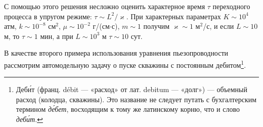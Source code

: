 С помощью этого решения несложно оценить характерное время $\tau$ переходного процесса в упругом режиме: $\tau\sim L^2/\varkappa$. При характерных параметрах $K\sim10^4$ атм, $k\sim10^{-8}$ см$^2$, $\mu\sim10^{-2}$ г/(см$\cdot$с), $m\sim1$ получим $\varkappa\sim1$ м$^2$/с, и если $L\sim10$ м, то $\tau\sim1$ мин, а при $L\sim10^3$ м $\tau\sim10$ сут.

\setcounter{footnote}{0}
В качестве второго примера использования уравнения пьезопроводности рассмотрим автомодельную задачу о пуске скважины с постоянным дебитом\footnote{Деби́т (франц. débit --- «расход» от лат. debitum --- «долг») --- объемный расход (колодца, скважины). Это название не следует путать с бухгалтерским термином \textit{де́бет}, восходящим к тому же латинскому корню, что и слово \textit{деби́т}.}.

